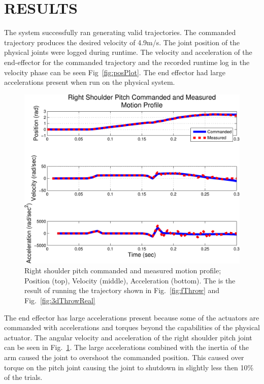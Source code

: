 \section{RESULTS}
The system successfully ran generating valid trajectories.    The commanded trajectory produces the desired velocity of 4.9m/s.  The joint position of the physical joints were logged during runtime.  The velocity and acceleration of the end-effector for the commanded trajectory and the recorded runtime log in the velocity phase can be seen Fig~\ref{fig:posPlot}.  The end effector had large accelerations present when run on the physical system.  

\begin{figure}[thpb]
  \centering
\includegraphics[width=1.0\columnwidth]{./MATLAB/throwTrajRSPplot.pdf}
  \caption{Right shoulder pitch commanded and measured motion profile; Position (top), Velocity (middle), Acceleration (bottom).  The is the result of running the trajectory shown in Fig.~\ref{fig:fThrow} and Fig.~\ref{fig:3dThrowReal}}
  \label{fig:velosPlot}
\end{figure}


The end effector has large accelerations present because some of the actuators are commanded with accelerations and torques beyond the capabilities of the physical actuator.  The angular velocity and acceleration of the right shoulder pitch joint can be seen in Fig.~\ref{fig:velosPlot}.  The large accelerations combined with the inertia of the arm caused the joint to overshoot the commanded position.  This caused over torque on the pitch joint causing the joint to shutdown in slightly less then 10\% of the trials.



